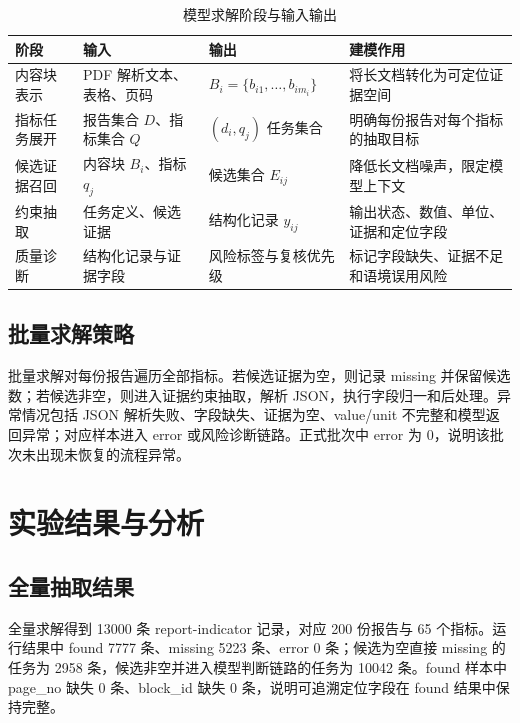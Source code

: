 \documentclass[bwprint]{gmcmthesis}
\numberwithin{figure}{section}
\begin{document}
\begin{table}[htbp]
\centering
\caption{模型求解阶段与输入输出}
\label{tab:module}
\begin{tabularx}{\linewidth}{p{2.6cm}p{3.1cm}p{3.1cm}X}
\toprule
阶段 & 输入 & 输出 & 建模作用 \\
\midrule
内容块表示 & PDF 解析文本、表格、页码 & $B_i=\{b_{i1},\ldots,b_{im_i}\}$ & 将长文档转化为可定位证据空间 \\
指标任务展开 & 报告集合 $D$、指标集合 $Q$ & $(d_i,q_j)$ 任务集合 & 明确每份报告对每个指标的抽取目标 \\
候选证据召回 & 内容块 $B_i$、指标 $q_j$ & 候选集合 $E_{ij}$ & 降低长文档噪声，限定模型上下文 \\
约束抽取 & 任务定义、候选证据 & 结构化记录 $y_{ij}$ & 输出状态、数值、单位、证据和定位字段 \\
质量诊断 & 结构化记录与证据字段 & 风险标签与复核优先级 & 标记字段缺失、证据不足和语境误用风险 \\
\bottomrule
\end{tabularx}
\end{table}

\subsection{批量求解策略}
批量求解对每份报告遍历全部指标。若候选证据为空，则记录 missing 并保留候选数；若候选非空，则进入证据约束抽取，解析 JSON，执行字段归一和后处理。异常情况包括 JSON 解析失败、字段缺失、证据为空、value/unit 不完整和模型返回异常；对应样本进入 error 或风险诊断链路。正式批次中 error 为 0，说明该批次未出现未恢复的流程异常。

\newpage
\section{实验结果与分析}
\subsection{全量抽取结果}
全量求解得到 13000 条 report-indicator 记录，对应 200 份报告与 65 个指标。运行结果中 found 7777 条、missing 5223 条、error 0 条；候选为空直接 missing 的任务为 2958 条，候选非空并进入模型判断链路的任务为 10042 条。found 样本中 page\_no 缺失 0 条、block\_id 缺失 0 条，说明可追溯定位字段在 found 结果中保持完整。

\begin{table}[htbp]
\centering
\caption{全量抽取结果摘要}
\label{tab:result-summary}

\end{table}
\end{document}

